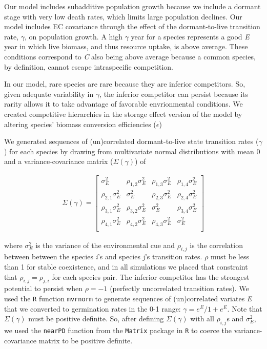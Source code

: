 \documentclass[12pt,]{article}
\begin{document}
Our model includes subadditive population growth because we include a
dormant stage with very low death rates, which limits large population
declines. Our model includes EC covariance through the effect of the
dormant-to-live transition rate, \(\gamma\), on population growth. A
high \(\gamma\) year for a species represents a good \emph{E} year in
which live biomass, and thus resource uptake, is above average. These
conditions correspond to \emph{C} also being above average because a
common species, by definition, cannot escape intraspecific competition.

In our model, rare species are rare because they are inferior
competitors. So, given adequate variability in \(\gamma\), the inferior
competitor can persist because its rarity allows it to take advantage of
favorable envrionmental conditions. We created competitive hierarchies
in the storage effect version of the model by altering species' biomass
conversion efficiencies (\(\epsilon\))

We generated sequences of (un)correlated dormant-to-live state
transition rates (\(\gamma\)) for each species by drawing from
multivariate normal distributions with mean 0 and a variance-covariance
matrix (\(\Sigma(\gamma)\)) of

\begin{align}
\Sigma(\gamma) = 
\begin{bmatrix}
\sigma^2_{E} & \rho_{1,2}\sigma^2_{E} & \rho_{1,3}\sigma^2_{E} & \rho_{1,4}\sigma^2_{E} \\
\rho_{2,1}\sigma^2_{E} & \sigma^2_{E} & \rho_{2,3}\sigma^2_{E} & \rho_{2,4}\sigma^2_{E} \\
\rho_{3,1}\sigma^2_{E} & \rho_{3,2}\sigma^2_{E} & \sigma^2_{E}  & \rho_{3,4}\sigma^2_{E} \\
\rho_{4,1}\sigma^2_{E} & \rho_{4,2}\sigma^2_{E} & \rho_{4,3}\sigma^2_{E} & \sigma^2_{E}  \\
\end{bmatrix}
\end{align}

\noindent where \(\sigma^2_{E}\) is the variance of the environmental
cue and \(\rho_{i,j}\) is the correlation between between the species
\emph{i}'s and species \emph{j}'s transition rates. \(\rho\) must be
less than 1 for stable coexistence, and in all simulations we placed
that constraint that \(\rho_{i,j} = \rho_{j,i}\) for each species pair.
The inferior competitor has the strongest potential to persist when
\(\rho=-1\) (perfectly uncorrelated transition rates). We used the
\texttt{R} function \texttt{mvrnorm} to generate sequences of
(un)correlated variates \emph{E} that we converted to germination rates
in the 0-1 range: \(\gamma = e^E / 1 + e^E\). Note that
\(\Sigma(\gamma)\) must be positive definite. So, after defining
\(\Sigma(\gamma)\) with all \(\rho_{i,j}\)s and \(\sigma^2_{E}\), we
used the \texttt{nearPD} function from the \texttt{Matrix} package in
\texttt{R} to coerce the variance-covariance matrix to be positive
definite.
\end{document}
